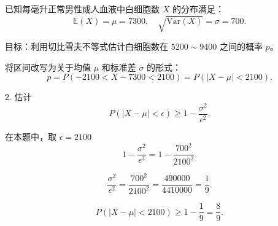 \documentclass[twoside]{article}
\begin{document}
\begin{ans}{36}{36}
    已知每毫升正常男性成人血液中白细胞数 \( X \) 的分布满足：
    \[
    \mathbb{E}(X) = \mu = 7300, \quad \sqrt{\text{Var}(X)} = \sigma = 700.
    \]
    
    目标：利用切比雪夫不等式估计白细胞数在 \( 5200 \sim 9400 \) 之间的概率 \( p \)。
    
    
    将区间改写为关于均值 \( \mu \) 和标准差 \( \sigma \) 的形式：
    \[
    p = P(-2100 < X - 7300 < 2100) = P(|X - \mu| < 2100).
    \]
    
    2. 估计 
    \[
    P(|X - \mu| < \epsilon) \geq 1 - \frac{\sigma^2}{\epsilon^2}.
    \]
    
    在本题中，取 \( \epsilon = 2100 \)
    \[
    1 - \frac{\sigma^2}{\epsilon^2} = 1 - \frac{700^2}{2100^2}.
    \]
    
    \[
    \frac{\sigma^2}{\epsilon^2} = \frac{700^2}{2100^2} = \frac{490000}{4410000} = \frac{1}{9}.
    \]
    
    \[
    P(|X - \mu| < 2100) \geq 1 - \frac{1}{9} = \frac{8}{9}.
    \]
    
\end{ans}
\end{document}
